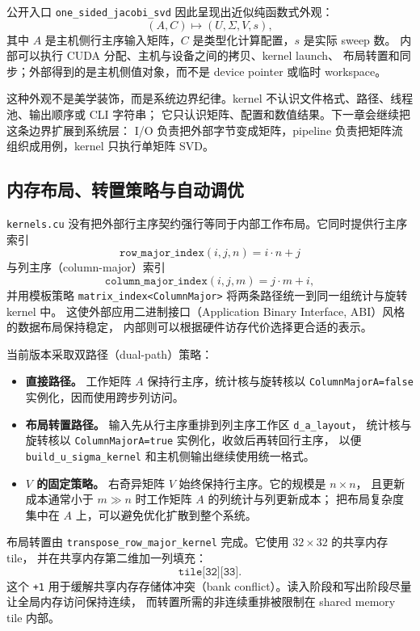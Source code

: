 公开入口 \texttt{one\_sided\_jacobi\_svd} 因此呈现出近似纯函数式外观：
\[
    (A,C)\mapsto(U,\Sigma,V,s),
\]
其中 \(A\) 是主机侧行主序输入矩阵，\(C\) 是类型化计算配置，\(s\) 是实际 sweep 数。
内部可以执行 CUDA 分配、主机与设备之间的拷贝、kernel launch、
布局转置和同步；外部得到的是主机侧值对象，而不是 device pointer 或临时 workspace。

这种外观不是美学装饰，而是系统边界纪律。kernel 不认识文件格式、路径、线程池、输出顺序或 CLI 字符串；
它只认识矩阵、配置和数值结果。下一章会继续把这条边界扩展到系统层：
I/O 负责把外部字节变成矩阵，pipeline 负责把矩阵流组织成用例，kernel 只执行单矩阵 SVD。

\subsection{内存布局、转置策略与自动调优}

\texttt{kernels.cu} 没有把外部行主序契约强行等同于内部工作布局。它同时提供行主序索引
\[
    \texttt{row\_major\_index}(i,j,n)=i\cdot n+j
\]
与列主序（column-major）索引
\[
    \texttt{column\_major\_index}(i,j,m)=j\cdot m+i,
\]
并用模板策略 \texttt{matrix\_index<ColumnMajor>} 将两条路径统一到同一组统计与旋转 kernel 中。
这使外部应用二进制接口（Application Binary Interface, ABI）风格的数据布局保持稳定，
内部则可以根据硬件访存代价选择更合适的表示。

当前版本采取双路径（dual-path）策略：

\begin{itemize}
    \item \textbf{直接路径。} 工作矩阵 \(A\) 保持行主序，统计核与旋转核以
          \texttt{ColumnMajorA=false} 实例化，因而使用跨步列访问。
    \item \textbf{布局转置路径。} 输入先从行主序重排到列主序工作区 \texttt{d\_a\_layout}，
          统计核与旋转核以 \texttt{ColumnMajorA=true} 实例化，收敛后再转回行主序，
          以便 \texttt{build\_u\_sigma\_kernel} 和主机侧输出继续使用统一格式。
    \item \textbf{\(V\) 的固定策略。} 右奇异矩阵 \(V\) 始终保持行主序。它的规模是 \(n\times n\)，
          且更新成本通常小于 \(m\gg n\) 时工作矩阵 \(A\) 的列统计与列更新成本；
          把布局复杂度集中在 \(A\) 上，可以避免优化扩散到整个系统。
\end{itemize}

布局转置由 \texttt{transpose\_row\_major\_kernel} 完成。它使用 \(32\times 32\) 的共享内存 tile，
并在共享内存第二维加一列填充：
\[
    \texttt{tile[32][33]}.
\]
这个 \texttt{+1} 用于缓解共享内存存储体冲突（bank conflict）。读入阶段和写出阶段尽量让全局内存访问保持连续，
而转置所需的非连续重排被限制在 shared memory tile 内部。

